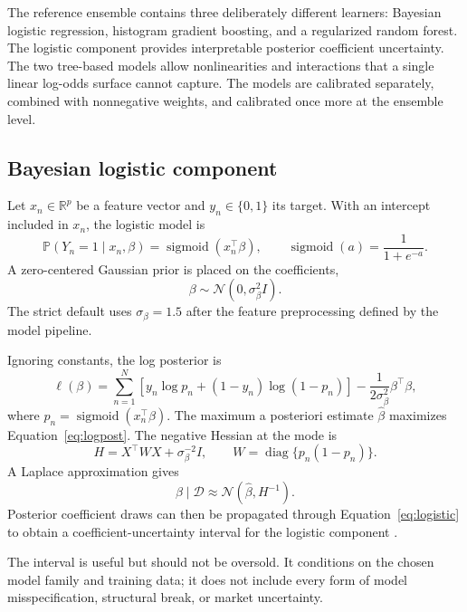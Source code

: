 \documentclass[11pt]{article}
\newcommand{\sigmoid}{\operatorname{sigmoid}}
\newcommand{\Prb}{\mathbb{P}}
\newcommand{\R}{\mathbb{R}}
\begin{document}
The reference ensemble contains three deliberately different learners: Bayesian logistic regression, histogram gradient boosting, and a regularized random forest. The logistic component provides interpretable posterior coefficient uncertainty. The two tree-based models allow nonlinearities and interactions that a single linear log-odds surface cannot capture. The models are calibrated separately, combined with nonnegative weights, and calibrated once more at the ensemble level.

\subsection{Bayesian logistic component}

Let $x_n\in\R^p$ be a feature vector and $y_n\in\{0,1\}$ its target. With an intercept included in $x_n$, the logistic model is
\begin{equation}
\Prb(Y_n=1\mid x_n,\beta)=\sigmoid(x_n^\top\beta),
\qquad
\sigmoid(a)=\frac{1}{1+e^{-a}}.
\label{eq:logistic}
\end{equation}
A zero-centered Gaussian prior is placed on the coefficients,
\begin{equation}
\beta\sim\mathcal N(0,\sigma_\beta^2I).
\label{eq:prior}
\end{equation}
The strict default uses $\sigma_\beta=1.5$ after the feature preprocessing defined by the model pipeline.

Ignoring constants, the log posterior is
\begin{equation}
\ell(\beta)
=\sum_{n=1}^{N}\left[y_n\log p_n+(1-y_n)\log(1-p_n)\right]
-\frac{1}{2\sigma_\beta^2}\beta^\top\beta,
\label{eq:logpost}
\end{equation}
where $p_n=\sigmoid(x_n^\top\beta)$. The maximum a posteriori estimate $\hat\beta$ maximizes Equation~\eqref{eq:logpost}. The negative Hessian at the mode is
\begin{equation}
H=X^\top W X+\sigma_\beta^{-2}I,
\qquad
W=\operatorname{diag}\{p_n(1-p_n)\}.
\label{eq:hessian}
\end{equation}
A Laplace approximation gives
\begin{equation}
\beta\mid\mathcal D\approx\mathcal N(\hat\beta,H^{-1}).
\label{eq:laplace}
\end{equation}
Posterior coefficient draws can then be propagated through Equation~\eqref{eq:logistic} to obtain a coefficient-uncertainty interval for the logistic component \citep{mackay1992bayesian}.

The interval is useful but should not be oversold. It conditions on the chosen model family and training data; it does not include every form of model misspecification, structural break, or market uncertainty.
\end{document}
